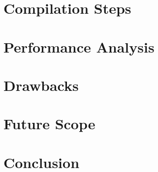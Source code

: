 \documentclass[12pt]{article}
\begin{document}
    
    \section{Compilation Steps}
    \section{Performance Analysis}
    \section{Drawbacks}
    \section{Future Scope}
    \section{Conclusion}
\end{document}
